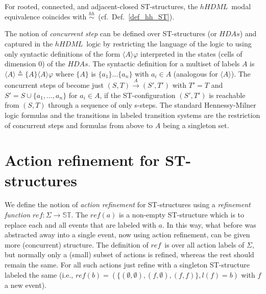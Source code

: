 \documentclass[submission,copyright,creativecommons]{eptcs}
\newcommand\start[2]{\ensuremath{\{#1\}#2}}
\newcommand\terminate[2]{\ensuremath{\langle #1\rangle #2}}
\newcommand\hHDML{\ensuremath{\mathit{hHDML}}}
\newcommand\HDAs{\ensuremath{\mathit{HDAs}}}
\newcommand\defequal{\ensuremath{\stackrel{\vartriangle}{=}}}
\newcommand\allST{\ensuremath{\mathbb{ST}}}
\newcommand\reffun{\ensuremath{\mathit{ref}}}
\newcommand\hhequiv{\ensuremath{\stackrel{hh}{\sim}}}
\newcommand{\transition}[1]{\ensuremath{\xrightarrow{#1}}}
\begin{document}
{{For rooted, connected, and adjacent-closed ST-structures, the \hHDML\ modal equivalence coincides with \hhequiv\ (cf.~Def.~\ref{def_hh_ST}).


The notion of \textit{concurrent step} \cite[def.7.1]{GlabbeekG01refinement} can be defined over ST-structures (or \HDAs) and captured in the \hHDML\ logic by restricting the language of the logic to using only syntactic definitions of the form $\langle A\rangle\varphi$ interpreted in the states (cells of dimension $0$) of the \HDAs. The syntactic definition for a multiset of labels $A$ is $\langle A \rangle\defequal\start{A}{\terminate{A}{\varphi}}$ where $\start{A}{}$ is $\start{a_1}{\dots\start{a_n}{}}$ with $a_i\in A$ (analogous for $\terminate{A}{}$). The concurrent steps of \cite[def.7.1]{GlabbeekG01refinement} become just $(S,T)\transition{A}(S',T')$ with $T'=T$ and $S'=S\cup\{a_1,\dots,a_n\}$ for $a_i\in A$, if the ST-configuration $(S',T')$ is reachable from $(S,T)$ through a sequence of only s-steps. The standard Hennessy-Milner logic formulas and the transitions in labeled transition systems are the restriction of concurrent steps and formulas from above to $A$ being a singleton set.

}

}





\section{Action refinement for ST-structures}\label{subsec_actref}

We define the notion of \textit{action refinement} \cite{GlabbeekG01refinement} for ST-structures  using a \textit{refinement function} $\reffun:\Sigma\rightarrow \allST$. The $\reffun(a)$ is a non-empty ST-structure which is to replace each and all events that are labeled with $a$. In this way, what before was abstracted away into a single event, now using action refinement, can be given more (concurrent) structure. The definition of \reffun\ is over all action labels of $\Sigma$, but normally only a (small) subset of actions is refined, whereas the rest should remain the same. For all such actions just refine with a singleton ST-structure labeled the same 
(i.e., $\reffun(b)=(\{(\emptyset,\emptyset),(f,\emptyset),(f,f)\},l(f)=b)$ with $f$ a new event).
\end{document}
